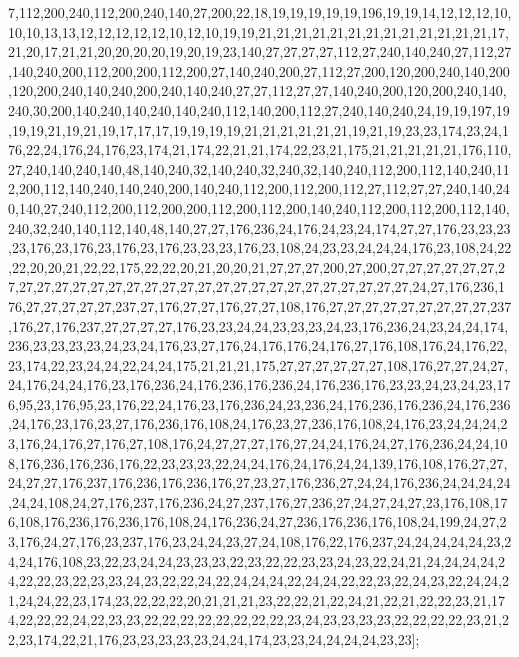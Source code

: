 7,112,200,240,112,200,240,140,27,200,22,18,19,19,19,19,19,196,19,19,14,12,12,12,10,10,10,13,13,12,12,12,12,12,10,12,10,19,19,21,21,21,21,21,21,21,21,21,21,21,21,21,17,21,20,17,21,21,20,20,20,20,19,20,19,23,140,27,27,27,27,112,27,240,140,240,27,112,27,140,240,200,112,200,200,112,200,27,140,240,200,27,112,27,200,120,200,240,140,200,120,200,240,140,240,200,240,140,240,27,27,112,27,27,140,240,200,120,200,240,140,240,30,200,140,240,140,240,140,240,112,140,200,112,27,240,140,240,24,19,19,197,19,19,19,21,19,21,19,17,17,17,19,19,19,19,21,21,21,21,21,21,19,21,19,23,23,174,23,24,176,22,24,176,24,176,23,174,21,174,22,21,21,174,22,23,21,175,21,21,21,21,21,176,110,27,240,140,240,140,48,140,240,32,140,240,32,240,32,140,240,112,200,112,140,240,112,200,112,140,240,140,240,200,140,240,112,200,112,200,112,27,112,27,27,240,140,240,140,27,240,112,200,112,200,200,112,200,112,200,140,240,112,200,112,200,112,140,240,32,240,140,112,140,48,140,27,27,176,236,24,176,24,23,24,174,27,27,176,23,23,23,23,176,23,176,23,176,23,176,23,23,23,176,23,108,24,23,23,24,24,24,176,23,108,24,22,22,20,20,21,22,22,175,22,22,20,21,20,20,21,27,27,27,200,27,200,27,27,27,27,27,27,27,27,27,27,27,27,27,27,27,27,27,27,27,27,27,27,27,27,27,27,27,27,27,24,27,176,236,176,27,27,27,27,27,237,27,176,27,27,176,27,27,108,176,27,27,27,27,27,27,27,27,27,237,176,27,176,237,27,27,27,27,176,23,23,24,24,23,23,23,24,23,176,236,24,23,24,24,174,236,23,23,23,23,24,23,24,176,23,27,176,24,176,176,24,176,27,176,108,176,24,176,22,23,174,22,23,24,24,22,24,24,175,21,21,21,175,27,27,27,27,27,27,108,176,27,27,24,27,24,176,24,24,176,23,176,236,24,176,236,176,236,24,176,236,176,23,23,24,23,24,23,176,95,23,176,95,23,176,22,24,176,23,176,236,24,23,236,24,176,236,176,236,24,176,236,24,176,23,176,23,27,176,236,176,108,24,176,23,27,236,176,108,24,176,23,24,24,24,23,176,24,176,27,176,27,108,176,24,27,27,27,176,27,24,24,176,24,27,176,236,24,24,108,176,236,176,236,176,22,23,23,23,22,24,24,176,24,176,24,24,139,176,108,176,27,27,24,27,27,176,237,176,236,176,236,176,27,23,27,176,236,27,24,24,176,236,24,24,24,24,24,24,108,24,27,176,237,176,236,24,27,237,176,27,236,27,24,27,24,27,23,176,108,176,108,176,236,176,236,176,108,24,176,236,24,27,236,176,236,176,108,24,199,24,27,23,176,24,27,176,23,237,176,23,24,24,23,27,24,108,176,22,176,237,24,24,24,24,24,23,24,24,176,108,23,22,23,24,24,23,23,23,22,23,22,22,23,23,24,23,22,24,21,24,24,24,24,24,22,22,23,22,23,23,24,23,22,22,24,22,24,24,24,22,24,24,22,22,23,22,24,23,22,24,24,21,24,24,22,23,174,23,22,22,22,20,21,21,21,23,22,22,21,22,24,21,22,21,22,22,23,21,174,22,22,22,24,22,23,23,22,22,22,22,22,22,22,22,23,24,23,23,23,23,22,22,22,22,23,21,22,23,174,22,21,176,23,23,23,23,23,24,24,174,23,23,24,24,24,24,23,23];

